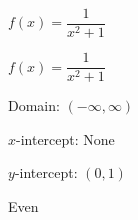 {$f(x) = \dfrac{1}{x^{2} + 1}$}
{$f(x) = \dfrac{1}{x^{2} + 1}$ 

Domain: $(-\infty, \infty)$ 

$x$-intercept: None 

$y$-intercept: $(0, 1)$ 

Even

\begin{center}
\end{center}
}